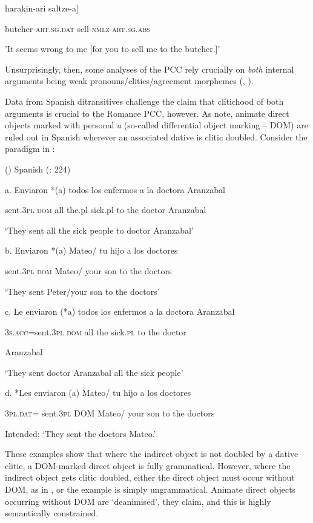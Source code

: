 \documentclass[output=paper,modfonts,nonflat]{langsci/langscibook}
\begin{document}
  harakin-ari    saltze-a]  

  butcher-\textsc{art.sg}.\textsc{dat}  sell-\textsc{nmlz-art.sg.abs} 

  {}'It seems wrong to me [for you to sell me to the butcher.]' 

Unsurprisingly, then, some analyses of the PCC rely crucially on \textit{both} internal arguments being weak pronouns/clitics/agreement morphemes (\citealt{Bianchi2006}, \citealt{Stegovec2017}). 

  Data from Spanish ditransitives challenge the claim that clitichood of both arguments is crucial to the Romance PCC, however. As \citet{OrmazabalRomero2013} note, animate direct objects marked with personal \textit{a} (so-called differential object marking – DOM) are ruled out in Spanish wherever an associated dative is clitic doubled. Consider the paradigm in :

()  Spanish (\citealt{OrmazabalRomero2013}: 224)

a.  Enviaron   *(a)   todos los   enfermos a   la   doctora   Aranzabal

sent.\textsc{3pl}  \textsc{dom}   all   the.pl   sick.pl   to   the   doctor   Aranzabal

‘They sent all the sick people to doctor Aranzabal’

b.  Enviaron  *(a)   Mateo/  tu   hijo   a   los   doctores

sent.\textsc{3pl}  \textsc{dom}   Mateo/  your   son   to   the   doctors

‘They sent Peter/your son to the doctors’

c.   Le   enviaron   (*a)  todos   los  enfermos   a  la  doctora   Aranzabal

\textsc{3s.acc=}sent.\textsc{3pl}   \textsc{dom}   all   the sick.\textsc{pl}   to   the doctor   

Aranzabal

‘They sent doctor Aranzabal all the sick people’

d.   *Les   enviaron   (a)   Mateo/  tu   hijo  a   los   doctores

\textsc{3pl.dat}=  sent.\textsc{3pl}   DOM   Mateo/  your   son   to   the   doctors

Intended: ‘They sent the doctors Mateo.’

These examples show that where the indirect object is not doubled by a dative clitic, a DOM-marked direct object is fully grammatical. However, where the indirect object gets clitic doubled, either the direct object must occur without DOM, as in , or the example is simply ungrammatical. Animate direct objects occurring without DOM are ‘deanimised’, they claim, and this is highly semantically constrained. 
\end{document}

